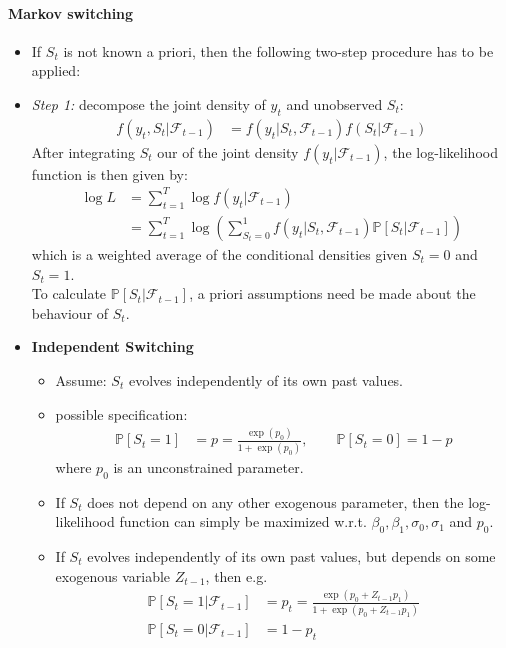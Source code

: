 \documentclass[a4paper,landscape,8pt,fleqn]{scrartcl}
\renewcommand{\emph}[1]{\textbf{#1}}
\begin{document}
\begin{multicols*}{3}
\paragraph{Markov switching}
\begin{itemize}
\item If $S_t$ is not known a priori, then the following two-step procedure has to be applied:
\item \textit{Step 1:} decompose the joint density of $y_t$ and unobserved $S_t$:
\begin{align*}
f(y_t,S_t | \mathcal{F}_{t-1}) &= f(y_t | S_t, \mathcal{F}_{t-1}) f(S_t | \mathcal{F}_{t-1})
\end{align*}
After integrating $S_t$ our of the joint density $f(y_t | \mathcal{F}_{t-1})$, the log-likelihood function is then given by:
\begin{align*}
\log L &= \sum_{t=1}^T \log f(y_t | \mathcal{F}_{t-1}) \\
&= \sum_{t=1}^T \log \left( \sum_{S_t=0}^1 f(y_t | S_t, \mathcal{F}_{t-1}) \mathbb{P}[S_t | \mathcal{F}_{t-1}] \right)
\end{align*}
which is a weighted average of the conditional densities given $S_t = 0$ and $S_t = 1$. \\
To calculate $\mathbb{P}[S_t | \mathcal{F}_{t-1}]$, a priori assumptions need be made about the behaviour of $S_t$.
\item \emph{Independent Switching}
\begin{itemize}
\item Assume: $S_t$ evolves independently of its own past values.
\item possible specification:
\begin{align*}
\mathbb{P}[S_t = 1] &= p = \frac{\exp(p_0)}{1 + \exp(p_0)}, \qquad \mathbb{P}[S_t = 0] = 1-p
\end{align*}
where $p_0$ is an unconstrained parameter.
\item If $S_t$ does not depend on any other exogenous parameter, then the log-likelihood function can simply be maximized w.r.t. $\beta_0, \beta_1, \sigma_0, \sigma_1$ and $p_0$.
\item If $S_t$ evolves independently of its own past values, but depends on some exogenous variable $Z_{t-1}$, then e.g.
\begin{align*}
\mathbb{P}[S_t = 1 | \mathcal{F}_{t-1}] &= p_t = \frac{\exp(p_0 + Z_{t-1} p_1)}{1 + \exp(p_0 + Z_{t-1} p_1)} \\
\mathbb{P}[S_t = 0 | \mathcal{F}_{t-1}] &= 1-p_t
\end{align*}

\end{itemize}
\end{itemize}
\end{multicols*}
\end{document}

